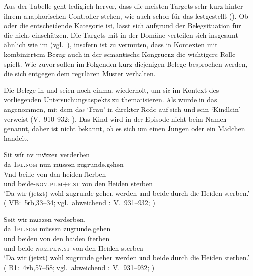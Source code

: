Aus der Tabelle geht lediglich hervor, dass die meisten Targets sehr kurz
hinter ihrem anaphorischen Controller stehen, wie auch schon für das
\CAO{} festgestellt (). Ob  oder
 die entscheidende Kategorie ist, lässt sich aufgrund der
Belegsituation für die   nicht einschätzen.
Die Targets mit  in der Domäne  verteilen sich insgesamt ähnlich wie im
\CAO{} (vgl.~), insofern ist zu vermuten, dass in
Kontexten mit kombiniertem Bezug auch in der \KC{} semantische
Kongruenz die wichtigere Rolle spielt. Wie zuvor
sollen im Folgenden kurz diejenigen Belege besprochen werden, die sich entgegen
dem regulären Muster verhalten.

Die Belege in  und  seien noch einmal
wiederholt, um sie im Kontext des vorliegenden Unter\-suchungsaspekts zu
thematisieren. Als  wurde in  das
  angenommen, mit dem das  `Frau' in
direkter Rede auf sich und sein  `Kindlein' verweist
(V.~910--932; \cite[98]{schroeder1895}). Das Kind wird in der Episode nicht
beim Namen genannt, daher ist nicht bekannt, ob es sich um einen Jungen oder
ein Mädchen handelt.

\begin{exe}
\ex \label{ex:wipkindelin2}
	\begin{xlist}
	\ex \label{ex:wipkindelin2_1}
		\gll Sit wír nv mvͤzzen verderben \\
			da \textsc{1pl\tsub{\SF/\SX}.nom} nun müssen zugrunde.gehen \\
	\sn \gll Vnd beide von den heiden ſterben \\
			und beide-\textsc{nom.pl.m+f\tsub{\SF/\SX}.st} von den Heiden
				sterben \\
		\trans `Da wir (jetzt) wohl zugrunde gehen werden und beide durch die Heiden sterben.'
			(%
				VB:~5rb,33--34; vgl.~abweichend
				\KC:~V.~931--932;
				\cite[98]{schroeder1895}%
			)
		
	\ex \label{ex:wipkindelin2_2}
		\gll Seit wir muͤzzen verderben. \\
			da \textsc{1pl\tsub{\SF/\SX}.nom} müssen zugrunde.gehen \\
	\sn \gll und beideu von den haiden ſterben \\
			und beide-\textsc{nom.pl.n\tsub{\SF/\SX}.st} von den Heiden
				sterben \\
		\trans `Da wir (jetzt) wohl zugrunde gehen werden und beide durch die Heiden sterben.'
			(%
				B1:~4vb,57--58; vgl.~abweichend
				\KC:~V.~931--932;
				\cite[98]{schroeder1895}%
			)
	\end{xlist}%
\end{exe}

